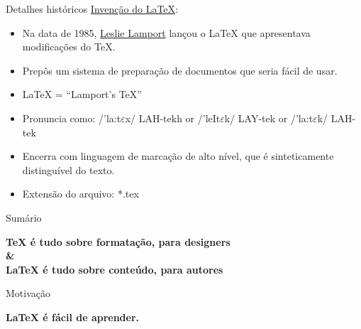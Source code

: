 \documentclass[10pt]{beamer}
\begin{document}

\begin{frame}{Detalhes históricos}
\underline{\color{brown}Invenção do \LaTeX}:

\begin{itemize}


\item Na data de 1985, {\color{blue}\href{https://en.wikipedia.org/wiki/Leslie_Lamport}{Leslie Lamport}} lançou o \LaTeX\hspace{0.01cm} que apresentava modificações do \TeX.

\item Prepôs um sistema de preparação de documentos que seria fácil de usar.

\item \LaTeX\hspace{0.01cm} = \textquotedblleft {\color{purple}Lamport's \TeX}\textquotedblright

\item {\color{orange}Pronuncia} como: /'la:t$\varepsilon$x/ LAH-tekh or /'leIt$\varepsilon$k/ LAY-tek or {\color{violet}/'la:t$\varepsilon$k/ LAH-tek}

\item Encerra com linguagem de marcação de alto nível, que é sinteticamente distinguível do texto.

\item Extensão do arquivo: {\color{blue}\textsf{*.tex}}


\end{itemize}
\end{frame}


\begin{frame}{Sumário}
\begin{center}

\bfseries \Large \TeX\hspace{0.01cm} é tudo sobre formatação, para designers\\
\& \\
\LaTeX\hspace{0.01cm} é tudo sobre conteúdo, para autores

\end{center}
\end{frame}




\begin{frame}{Motivação}
\begin{center}

\bfseries \Large \LaTeX\hspace{0.01cm} é fácil de aprender.

\end{center}
\end{frame}
\end{document}
